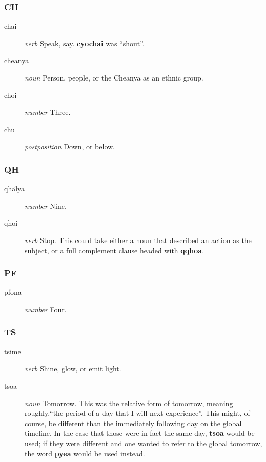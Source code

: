 \documentclass{article}
\begin{document}
\subsubsection{CH}

\begin{description}
\item [chai] \emph{verb} Speak, say.  \textbf{cyochai} was ``shout''.
\item [cheanya] \emph{noun} Person, people, or the Cheanya as an ethnic group.
\item [choi] \emph{number} Three.
\item [chu] \emph{postposition} Down, or below.
\end{description}

\subsubsection{QH}

\begin{description}
\item [qh\"alya] \emph{number} Nine.
\item [qhoi] \emph{verb} Stop.  This could take either a noun that described an action as the subject, or a full complement clause headed with \textbf{qqhoa}.
\end{description}

\subsubsection{PF}

\begin{description}
\item [pfona] \emph{number} Four.
\end{description}

\subsubsection{TS}

\begin{description}
\item [tsime] \emph{verb} Shine, glow, or emit light.
\item [tsoa] \emph{noun} Tomorrow.  This was the relative form of tomorrow, meaning roughly,``the period of a day that I will next experience''.  This might, of course, be different than the immediately following day on the global timeline.  In the case that those were in fact the same day, \textbf{tsoa} would be used; if they were different and one wanted to refer to the global tomorrow, the word \textbf{pyea} would be used instead.
\end{description}
\end{document}
